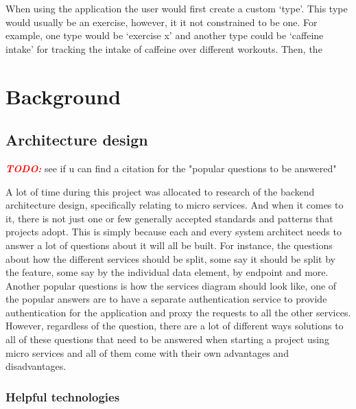 \documentclass{article}
\newcommand{\vspaceconst}{-2ex}
\newcommand{\TODO}{\textbf{\textit{\textcolor{red}{TODO:}}} }
\begin{document}
\begin{multicols}{2}
When using the application the user would first create a custom `type'. This type would usually be an exercise, however, it it not constrained to be one. For example, one type would be `exercise x' and another type could be `caffeine intake' for tracking the intake of caffeine over different workouts. Then, the 

\section{Background}
\vspace{\vspaceconst}

\subsection{Architecture design}
\TODO see if u can find a citation for the "popular questions to be answered" 

A lot of time during this project was allocated to research of the backend architecture design, specifically relating to micro services. And when it comes to it, there is not just one or few generally accepted standards and patterns that projects adopt. This is simply because each and every system architect needs to answer a lot of questions about it will all be built.
 For instance, the questions about how the different services should be split, some say it should be split by the feature, some say by the individual data element, by endpoint and more. Another popular questions is how the services diagram should look like, one of the popular answers are to have a separate authentication service to provide authentication for the application and proxy the requests to all the other services. However, regardless of the question, there are a lot of different ways solutions to all of these questions that need to be answered when starting a project using micro services and all of them come with their own advantages and disadvantages. 

\subsubsection{Helpful technologies}


\end{multicols}
\end{document}
